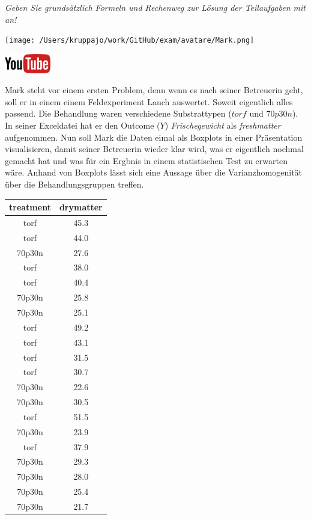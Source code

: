 \documentclass[a4paper, 9pt]{scrartcl}\usepackage[]{graphicx}\usepackage[]{xcolor}
\begin{document}
\textit{Geben Sie grundsätzlich Formeln und Rechenweg zur Lösung der Teilaufgaben mit an!} \\[1Ex]
 

 
\begin{minipage}[t]{0.5\textwidth}
\texttt{[image: /Users/kruppajo/work/GitHub/exam/avatare/Mark.png]}
\end{minipage}
\begin{minipage}[t]{0.5\textwidth}
\hfill
\href{https://youtu.be/0xc0jIPeiyw}{\includegraphics[width = 2cm]{img/youtube}}\\[1Ex]
\end{minipage}
\vspace{1ex}



Mark steht vor einem ersten Problem, denn wenn es nach seiner Betreuerin geht, soll er in einem einem Feldexperiment Lauch auswertet. Soweit eigentlich alles passend. Die Behandlung waren verschiedene Substrattypen ($torf$ und $70p30n$). In seiner Exceldatei hat er den Outcome ($Y$) \textit{Frischegewicht} als \textit{freshmatter} aufgenommen. Nun soll Mark die Daten eimal als Boxplots in einer Präsentation visualisieren, damit seiner Betreuerin wieder klar wird, was er eigentlich nochmal gemacht hat und was für ein Ergbnis in einem statistischen Test zu erwarten wäre. Anhand von Boxplots lässt sich eine Aussage über die Varianzhomogenität über die Behandlungsgruppen treffen.

\begin{table}[!h]
\centering
\begin{tabular}{cc}
\toprule
treatment & drymatter\\
\midrule
torf & 45.3\\
torf & 44.0\\
70p30n & 27.6\\
torf & 38.0\\
torf & 40.4\\
\addlinespace
70p30n & 25.8\\
70p30n & 25.1\\
torf & 49.2\\
torf & 43.1\\
torf & 31.5\\
\addlinespace
torf & 30.7\\
70p30n & 22.6\\
70p30n & 30.5\\
torf & 51.5\\
70p30n & 23.9\\
\addlinespace
torf & 37.9\\
70p30n & 29.3\\
70p30n & 28.0\\
70p30n & 25.4\\
70p30n & 21.7\\
\bottomrule
\end{tabular}
\end{table}
\end{document}
